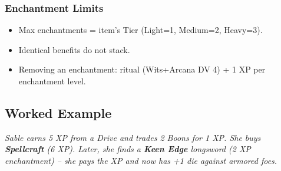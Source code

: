 \subsubsection*{Enchantment Limits}
\begin{itemize}
  \item Max enchantments = item's Tier (Light=1, Medium=2, Heavy=3).
  \item Identical benefits do not stack.
  \item Removing an enchantment: ritual (Wits+Arcana DV 4) + 1 XP per enchantment level.
\end{itemize}

\subsection{Worked Example}
\emph{Sable earns 5 XP from a Drive and trades 2 Boons for 1 XP. She buys \textbf{Spellcraft} (6 XP). Later, she finds a \textbf{Keen Edge} longsword (2 XP enchantment) – she pays the XP and now has +1 die against armored foes.}